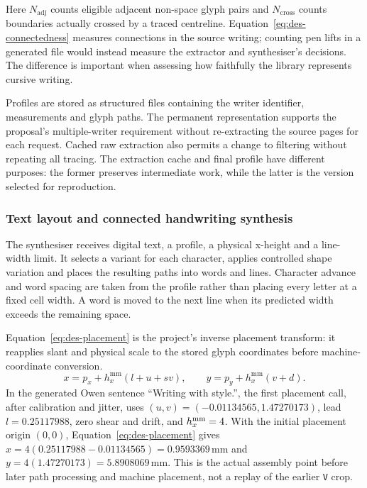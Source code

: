 Here $N_{\mathrm{adj}}$ counts eligible adjacent non-space glyph pairs and $N_{\mathrm{cross}}$ counts boundaries actually crossed by a traced centreline. Equation~\ref{eq:des-connectedness} measures connections in the source writing; counting pen lifts in a generated file would instead measure the extractor and synthesiser's decisions. The difference is important when assessing how faithfully the library represents cursive writing.

Profiles are stored as structured files containing the writer identifier, measurements and glyph paths. The permanent representation supports the proposal's multiple-writer requirement without re-extracting the source pages for each request. Cached raw extraction also permits a change to filtering without repeating all tracing. The extraction cache and final profile have different purposes: the former preserves intermediate work, while the latter is the version selected for reproduction.

\subsubsection{Text layout and connected handwriting synthesis}
\label{sec:des-layout}
The synthesiser receives digital text, a profile, a physical x-height and a line-width limit. It selects a variant for each character, applies controlled shape variation and places the resulting paths into words and lines. Character advance and word spacing are taken from the profile rather than placing every letter at a fixed cell width. A word is moved to the next line when its predicted width exceeds the remaining space.

Equation~\ref{eq:des-placement} is the project's inverse placement transform: it reapplies slant and physical scale to the stored glyph coordinates before machine-coordinate conversion.
\begin{equation}
x=p_x+h_x^{\mathrm{mm}}(l+u+sv),\qquad
y=p_y+h_x^{\mathrm{mm}}(v+d).
\label{eq:des-placement}
\end{equation}
In the generated Owen sentence ``Writing with style.'', the first placement call, after calibration and jitter, uses $(u,v)=(-0.01134565,1.47270173)$, lead $l=0.25117988$, zero shear and drift, and $h_x^{\rm mm}=4$. With the initial placement origin $(0,0)$, Equation~\ref{eq:des-placement} gives $x=4(0.25117988-0.01134565)=0.9593369$\,mm and $y=4(1.47270173)=5.8908069$\,mm. This is the actual assembly point before later path processing and machine placement, not a replay of the earlier \texttt{V} crop.

